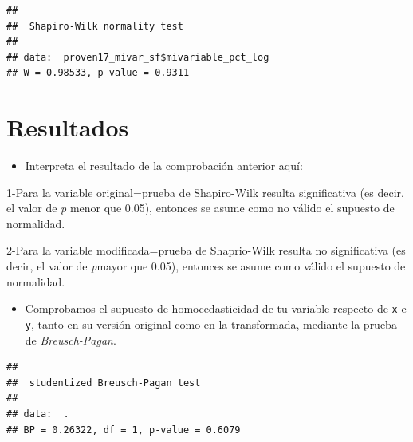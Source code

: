 \documentclass[11pt,]{article}
\newenvironment{Shaded}{\begin{snugshade}}{\end{snugshade}}
\newcommand{\KeywordTok}[1]{\textcolor[rgb]{0.13,0.29,0.53}{\textbf{#1}}}
\newcommand{\StringTok}[1]{\textcolor[rgb]{0.31,0.60,0.02}{#1}}
\newcommand{\CommentTok}[1]{\textcolor[rgb]{0.56,0.35,0.01}{\textit{#1}}}
\newcommand{\OperatorTok}[1]{\textcolor[rgb]{0.81,0.36,0.00}{\textbf{#1}}}
\newcommand{\NormalTok}[1]{#1}
\providecommand{\tightlist}{%
\setlength{\itemsep}{0pt}\setlength{\parskip}{0pt}}
\begin{document}
\begin{Shaded}
\end{Shaded}

\begin{verbatim}
## 
##  Shapiro-Wilk normality test
## 
## data:  proven17_mivar_sf$mivariable_pct_log
## W = 0.98533, p-value = 0.9311
\end{verbatim}

\section{Resultados}\label{resultados}

\begin{itemize}
\tightlist
\item
  Interpreta el resultado de la comprobación anterior aquí:
\end{itemize}

1-Para la variable original=prueba de Shapiro-Wilk resulta significativa
(es decir, el valor de \emph{p} menor que 0.05), entonces se asume como
no válido el supuesto de normalidad.

2-Para la variable modificada=prueba de Shaprio-Wilk resulta no
significativa (es decir, el valor de \emph{p}mayor que 0.05), entonces
se asume como válido el supuesto de normalidad.

\begin{itemize}
\tightlist
\item
  Comprobamos el supuesto de homocedasticidad de tu variable respecto de
  \texttt{x} e \texttt{y}, tanto en su versión original como en la
  transformada, mediante la prueba de \emph{Breusch-Pagan}.
\end{itemize}

\begin{Shaded}
\end{Shaded}

\begin{verbatim}
## 
##  studentized Breusch-Pagan test
## 
## data:  .
## BP = 0.26322, df = 1, p-value = 0.6079
\end{verbatim}
\end{document}
